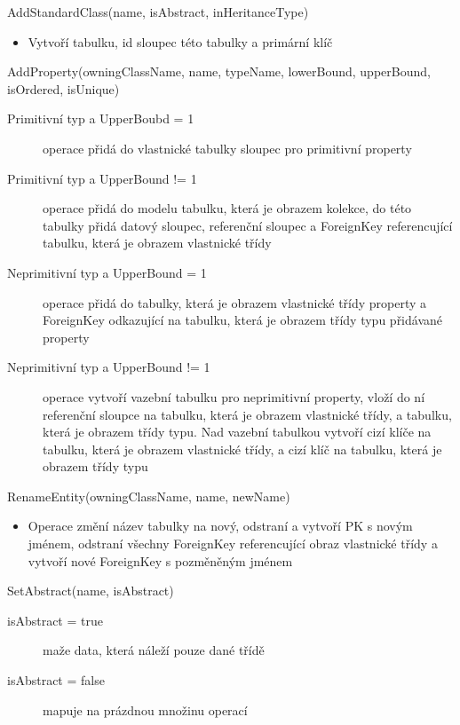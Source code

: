 \documentclass[11pt,twoside,a4paper]{book}
\begin{document}
\begin{list}{Operace :}{}
  \item AddStandardClass(name, isAbstract, inHeritanceType)
  \begin{itemize}
    \item Vytvoří tabulku, id sloupec této tabulky a primární klíč
  \end{itemize}
  
  \item AddProperty(owningClassName, name, typeName, lowerBound, upperBound,
  isOrdered, isUnique)
  \begin{description}
    \item[Primitivní typ a UpperBoubd = 1] operace přidá do vlastnické tabulky
    sloupec pro primitivní property
    \item[Primitivní typ a UpperBound != 1] operace přidá do modelu tabulku,
    která je obrazem kolekce, do této tabulky přidá datový sloupec, referenční
    sloupec a ForeignKey referencující tabulku, která je obrazem vlastnické třídy
    \item[Neprimitivní typ a UpperBound = 1] operace přidá do tabulky, která je
    obrazem vlastnické třídy property a ForeignKey odkazující na tabulku, která
    je obrazem třídy typu přidávané property
    \item[Neprimitivní typ a UpperBound != 1] operace vytvoří vazební tabulku
    pro neprimitivní property, vloží do ní referenční sloupce na tabulku, která je
    obrazem vlastnické třídy, a tabulku, která je obrazem třídy typu. Nad
    vazební tabulkou vytvoří cizí klíče na tabulku, která je
    obrazem vlastnické třídy, a cizí klíč na tabulku, která je obrazem třídy
    typu
  \end{description}
  
  \item RenameEntity(owningClassName, name, newName)
  \begin{itemize}
    \item Operace změní název tabulky na nový, odstraní a vytvoří PK s
novým jménem, odstraní všechny ForeignKey referencující obraz vlastnické
třídy a vytvoří nové ForeignKey s pozměněným jménem
  \end{itemize}
  
  \item SetAbstract(name, isAbstract)
  \begin{description}
    \item[isAbstract = true] maže data, která náleží pouze dané třídě
    \item[isAbstract = false] mapuje na prázdnou množinu operací
  \end{description}
  

\end{list}
\end{document}
